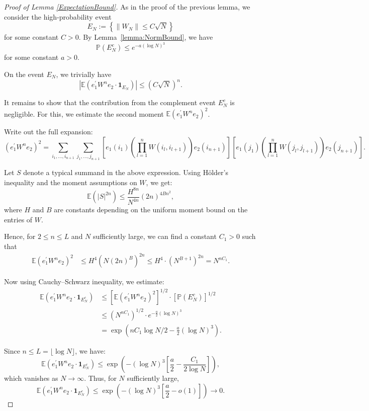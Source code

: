 \documentclass[11pt, reqno]{amsart}
\numberwithin{equation}{section}
\begin{document}
\begin{proof}[Proof of Lemma \ref{ExpectationBound}]
As in the proof of the previous lemma, we consider the high-probability event
\[
E_N := \left\{ \|W_N\| \le C\sqrt{N} \right\}
\]
for some constant \( C > 0 \). By Lemma~\ref{lemma:NormBound}, we have
\[
\mathbb{P}(E_N^c) \le e^{-a (\log N)^3}
\]
for some constant \( a > 0 \).

On the event \( E_N \), we trivially have
\[
|\mathbb{E}(e_1^\prime W^n e_2 \cdot \mathbf{1}_{E_N})| \le (C\sqrt{N})^n.
\]

It remains to show that the contribution from the complement event \( E_N^c \) is negligible. For this, we estimate the second moment \( \mathbb{E}(e_1^\prime W^n e_2)^2 \).

Write out the full expansion:
\[
(e_1^\prime W^n e_2)^2 = \sum_{i_1, \ldots, i_{n+1}} \sum_{j_1, \ldots, j_{n+1}} 
\left[ e_1(i_1) \left( \prod_{l=1}^{n} W(i_l, i_{l+1}) \right) e_2(i_{n+1}) \right]
\left[ e_1(j_1) \left( \prod_{l=1}^{n} W(j_l, j_{l+1}) \right) e_2(j_{n+1}) \right].
\]

Let \( S \) denote a typical summand in the above expression. Using Hölder's inequality and the moment assumptions on \( W \), we get:
\[
\mathbb{E}(|S|^{2n}) \le \frac{H^{8n}}{N^{4n}} (2n)^{4Bn^2},
\]
where \( H \) and \( B \) are constants depending on the uniform moment bound on the entries of \( W \).

Hence, for \( 2 \le n \le L \) and \( N \) sufficiently large, we can find a constant \( C_1 > 0 \) such that
\begin{align*}
\mathbb{E}(e_1^\prime W^n e_2)^2 
&\le H^4 \left( N (2n)^B \right)^{2n} 
\le H^4 \cdot (N^{B+1})^{2n} 
= N^{n C_1}.
\end{align*}

Now using Cauchy–Schwarz inequality, we estimate:
\begin{align*}
\mathbb{E}(e_1^\prime W^n e_2 \cdot \mathbf{1}_{E_N^c}) 
&\le \left[ \mathbb{E}(e_1^\prime W^n e_2)^2 \right]^{1/2} \cdot \left[ \mathbb{P}(E_N^c) \right]^{1/2} \\
&\le \left( N^{n C_1} \right)^{1/2} \cdot e^{- \frac{a}{2} (\log N)^3 } \\
&= \exp\left( n C_1 \log N / 2 - \frac{a}{2} (\log N)^3 \right).
\end{align*}

Since \( n \le L = \lfloor \log N \rfloor \), we have:
\[
\mathbb{E}(e_1^\prime W^n e_2 \cdot \mathbf{1}_{E_N^c}) 
\le \exp\left( - (\log N)^3 \left[ \frac{a}{2} - \frac{C_1}{2 \log N} \right] \right),
\]
which vanishes as \( N \to \infty \). Thus, for \( N \) sufficiently large,
\begin{equation}\label{ExpBound.Negligible}
\mathbb{E}(e_1^\prime W^n e_2 \cdot \mathbf{1}_{E_N^c}) \le \exp\left( -(\log N)^3 \left[ \frac{a}{2} - o(1) \right] \right) \to 0.
\end{equation}


\end{proof}
\end{document}
